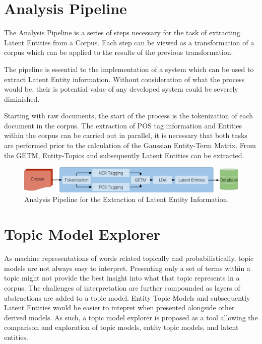 \documentclass[10pt]{report}
\begin{document}

\newpage
\section{Analysis Pipeline}
The Analysis Pipeline is a series of steps necessary for the task of extracting Latent Entities from a Corpus. Each step can be viewed as a transformation of a corpus which can be applied to the results of the previous transformation.

The pipeline is essential to the implementation of a system which can be used to extract Latent Entity information. Without consideration of what the process would be, their is potential value of any developed system could be severely diminished.

Starting with raw documents, the start of the process is the tokenization of each document in the corpus. The extraction of POS tag information and Entities within the corpus can be carried out in parallel, it is necessary that both tasks are performed prior to the calculation of the Gaussian Entity-Term Matrix. From the GETM, Entity-Topics and subsequently Latent Entities can be extracted.

\begin{figure}[h!]

  \centering
  \includegraphics[scale=0.445]{pipeline_diagram_bold}
  \caption{Analysis Pipeline for the Extraction of Latent Entity Information.\label{fig:pipeline_diagram}}
\end{figure}

\section{Topic Model Explorer}

As machine representations of words related topically and probabilistically, topic models are not always easy to interpret. Presenting only a set of terms within a topic might not provide the best insight into what that topic represents in a corpus. The challenges of interpretation are further compounded as layers of abstractions are added to a topic model. Entity Topic Models and subsequently Latent Entities would be easier to intepret when presented alongside other derived models. As such, a topic model explorer is proposed as a tool allowing the comparison and exploration of topic models, entity topic models, and latent entities.
\end{document}
